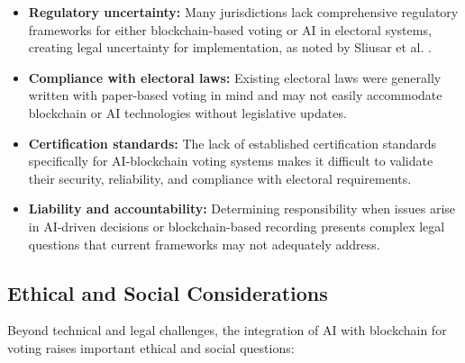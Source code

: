 \documentclass[conference]{IEEEtran}
\begin{document}
\begin{itemize}
    \item \textbf{Regulatory uncertainty:} Many jurisdictions lack comprehensive regulatory frameworks for either blockchain-based voting or AI in electoral systems, creating legal uncertainty for implementation, as noted by Sliusar et al. \cite{b4}.
    
    \item \textbf{Compliance with electoral laws:} Existing electoral laws were generally written with paper-based voting in mind and may not easily accommodate blockchain or AI technologies without legislative updates.
    
    \item \textbf{Certification standards:} The lack of established certification standards specifically for AI-blockchain voting systems makes it difficult to validate their security, reliability, and compliance with electoral requirements.
    
    \item \textbf{Liability and accountability:} Determining responsibility when issues arise in AI-driven decisions or blockchain-based recording presents complex legal questions that current frameworks may not adequately address.
\end{itemize}

\subsection{Ethical and Social Considerations}
Beyond technical and legal challenges, the integration of AI with blockchain for voting raises important ethical and social questions:
\end{document}
